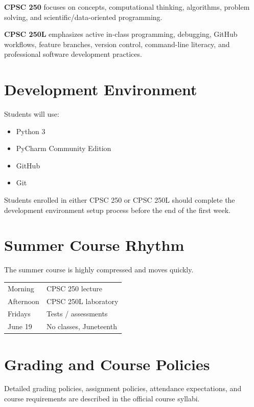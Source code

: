 \documentclass[11pt]{article}
\begin{document}
\textbf{CPSC 250} focuses on concepts, computational thinking, algorithms, problem solving, and scientific/data-oriented programming.

\textbf{CPSC 250L} emphasizes active in-class programming, debugging, GitHub workflows, feature branches, version control, command-line literacy, and professional software development practices.

\section{Development Environment}

Students will use:

\begin{itemize}
    \item Python 3
    \item PyCharm Community Edition
    \item GitHub
    \item Git
\end{itemize}

Students enrolled in either CPSC 250 or CPSC 250L should complete the development environment setup process before the end of the first week.

\section{Summer Course Rhythm}

The summer course is highly compressed and moves quickly.

\begin{center}
\renewcommand{\arraystretch}{1.25}
\begin{tabular}{ll}
\toprule
Morning & CPSC 250 lecture \\
Afternoon & CPSC 250L laboratory \\
Fridays & Tests / assessments \\
June 19 & No classes, Juneteenth \\
\bottomrule
\end{tabular}
\end{center}

\section{Grading and Course Policies}

Detailed grading policies, assignment policies, attendance expectations, and course requirements are described in the official course syllabi.
\end{document}
